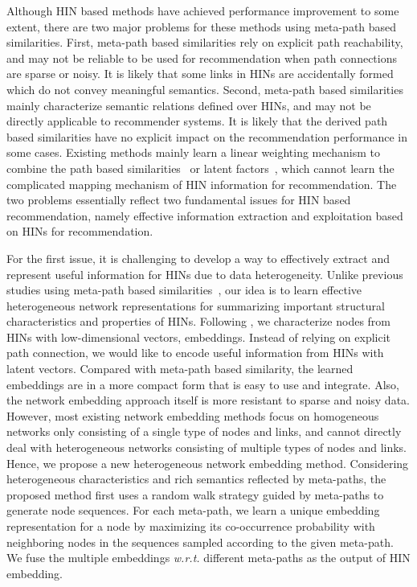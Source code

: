 Although HIN based methods have achieved performance improvement to some extent,
there are two major problems for these methods using meta-path based similarities.
First, meta-path based similarities rely on explicit path reachability,
and may not be reliable to be used for recommendation when
path connections are sparse or noisy.
It is likely that some links in HINs are accidentally formed which do not convey meaningful semantics.
Second, meta-path based similarities mainly characterize semantic relations defined over HINs, and may not be directly applicable to
recommender systems.
It is likely that the derived path based similarities have no explicit impact on the recommendation performance in some cases.
Existing methods mainly learn a linear weighting mechanism to combine the path based similarities~\cite{shi2016integrating} or latent factors~\cite{yu2013collaborative}, which cannot learn the complicated mapping mechanism of HIN information for recommendation.
The two problems essentially reflect two fundamental issues for HIN based recommendation, namely effective information extraction and exploitation based on HINs for recommendation.

For the first issue, it is challenging to develop a way to effectively extract and represent useful information for HINs due to data heterogeneity.
Unlike previous studies using meta-path based similarities~\cite{sun2011pathsim,yu2013collaborative}, our idea is to
learn effective heterogeneous network representations for summarizing important structural characteristics and properties of HINs.
Following \cite{perozzi2014deepwalk,grover2016node2vec}, we characterize nodes from HINs with low-dimensional vectors, \ie embeddings.
Instead of relying on explicit path connection, we would like to encode useful information from HINs with latent vectors.
Compared with meta-path based similarity, the learned embeddings are in a more compact form that is easy to use and integrate.
Also, the network embedding approach itself is more resistant to sparse and noisy data.
However, most existing network embedding methods focus on homogeneous networks only consisting of a single type of nodes and links, and cannot directly deal with heterogeneous networks consisting of multiple types of nodes and links. Hence, we propose a new heterogeneous network embedding method.
Considering heterogeneous characteristics and rich semantics reflected by meta-paths, the proposed method first uses a
random walk strategy guided by meta-paths to generate node sequences. For each meta-path, we learn a unique embedding representation for a node by maximizing its co-occurrence probability with neighboring nodes in the sequences sampled according to the given meta-path. We fuse the multiple embeddings \emph{w.r.t.} different meta-paths as the output of HIN embedding.

